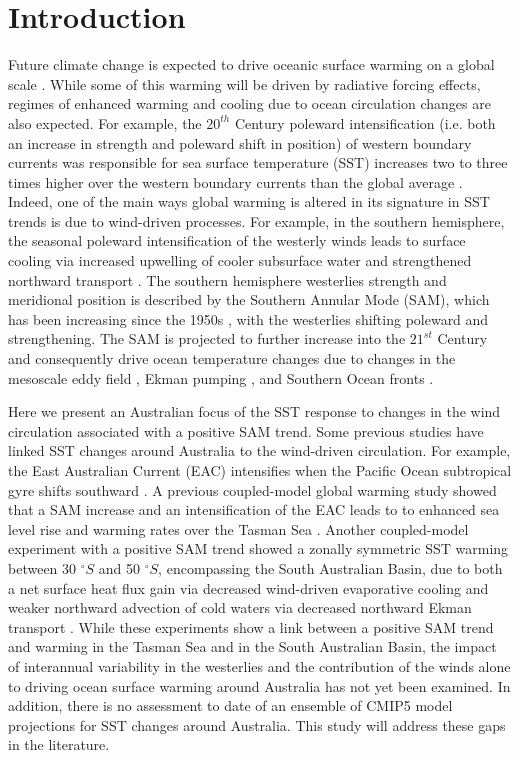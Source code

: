 \documentclass[draft,linenumbers]{agujournal2018}
\begin{document}
\section{Introduction}
Future climate change is expected to drive oceanic surface warming on a global scale \citep{Stocker2013}. While some of this warming will be driven by radiative forcing effects, regimes of enhanced warming and cooling due to ocean circulation changes are also expected. For example, the $20^{th}$ Century poleward intensification (i.e. both an increase in strength and poleward shift in position) of western boundary currents was responsible for sea surface temperature (SST) increases two to three times higher over the western boundary currents than the global average \citep{Wu2012}. Indeed, one of the main ways global warming is altered in its signature in SST trends is due to wind-driven processes. For example, in the southern hemisphere, the seasonal poleward intensification of the westerly winds leads to surface cooling via increased upwelling of cooler subsurface water and strengthened northward transport \citep{Purich2016}. The southern hemisphere westerlies strength and meridional position is described by the Southern Annular Mode (SAM), which has been increasing since the 1950s \citep{Marshall2003}, with the westerlies shifting poleward and strengthening. The SAM is projected to further increase into the $21^{st}$ Century \citep{Gillett2013} and consequently drive ocean temperature changes due to changes in the mesoscale eddy field \citep{Screen2009}, Ekman pumping \citep{Purich2016}, and Southern Ocean fronts \citep{Spence2010}.

Here we present an Australian focus of the SST response to changes in the wind circulation associated with a positive SAM trend. Some previous studies have linked SST changes around Australia to the wind-driven circulation. For example, the East Australian Current (EAC) intensifies when the Pacific Ocean subtropical gyre shifts southward \citep{Hill2011}. A previous coupled-model global warming study showed that a SAM increase and an intensification of the EAC leads to to enhanced sea level rise and warming rates over the Tasman Sea \citep{Cai2005}. Another coupled-model experiment with a positive SAM trend showed a zonally symmetric SST warming between 30 $^{\circ}S$ and 50 $^{\circ}S$, encompassing the South Australian Basin, due to both a net surface heat flux gain via decreased wind-driven evaporative cooling and weaker northward advection of cold waters via decreased northward Ekman transport \citep{SenGupta2006}. While these experiments show a link between a positive SAM trend and warming in the Tasman Sea and in the South Australian Basin, the impact of interannual variability in the westerlies and the contribution of the winds alone to driving ocean surface warming around Australia has not yet been examined. In addition, there is no assessment to date of an ensemble of CMIP5 model projections for SST changes around Australia. This study will address these gaps in the literature.
\end{document}
